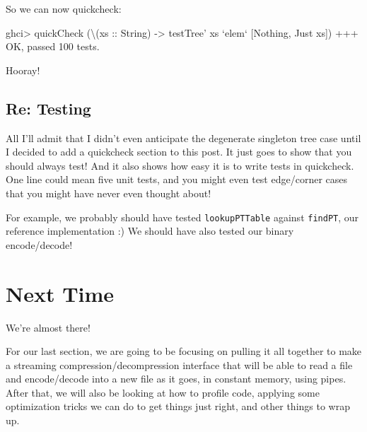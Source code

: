 \documentclass[]{article}
\newenvironment{Shaded}{}{}
\newcommand{\DataTypeTok}[1]{\textcolor[rgb]{0.56,0.13,0.00}{{#1}}}
\newcommand{\DecValTok}[1]{\textcolor[rgb]{0.25,0.63,0.44}{{#1}}}
\newcommand{\OtherTok}[1]{\textcolor[rgb]{0.00,0.44,0.13}{{#1}}}
\newcommand{\FunctionTok}[1]{\textcolor[rgb]{0.02,0.16,0.49}{{#1}}}
\newcommand{\NormalTok}[1]{{#1}}
\begin{document}
So we can now quickcheck:

\begin{Shaded}
\begin{Highlighting}[]
\NormalTok{ghci}\FunctionTok{>} \NormalTok{quickCheck (\textbackslash{}(}\OtherTok{xs ::} \DataTypeTok{String}\NormalTok{) }\OtherTok{->} \NormalTok{testTree' xs }\OtherTok{`elem`} \NormalTok{[}\DataTypeTok{Nothing}\NormalTok{, }\DataTypeTok{Just} \NormalTok{xs])}
\FunctionTok{+++} \DataTypeTok{OK}\NormalTok{, passed }\DecValTok{100} \NormalTok{tests}\FunctionTok{.}
\end{Highlighting}
\end{Shaded}

Hooray!

\subsection{Re: Testing}\label{re-testing}

All I'll admit that I didn't even anticipate the degenerate singleton
tree case until I decided to add a quickcheck section to this post. It
just goes to show that you should always test! And it also shows how
easy it is to write tests in quickcheck. One line could mean five unit
tests, and you might even test edge/corner cases that you might have
never even thought about!

For example, we probably should have tested \texttt{lookupPTTable}
against \texttt{findPT}, our reference implementation :) We should have
also tested our binary encode/decode!

\section{Next Time}\label{next-time}

We're almost there!

For our last section, we are going to be focusing on pulling it all
together to make a streaming compression/decompression interface that
will be able to read a file and encode/decode into a new file as it
goes, in constant memory, using pipes. After that, we will also be
looking at how to profile code, applying some optimization tricks we can
do to get things just right, and other things to wrap up.
\end{document}
